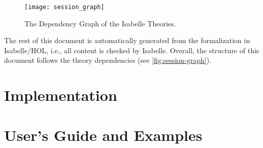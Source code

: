 \documentclass[11pt,DIV=12,a4paper,abstract=true,twoside=semi,openright]
{scrreprt}
\begin{document}
\begin{figure}
  \centering
  \texttt{[image: session\_graph]}
  \caption{The Dependency Graph of the Isabelle Theories.\label{fig:session-graph}}
\end{figure}
The rest of this document is automatically generated from the
formalization in Isabelle/HOL, i.e., all content is checked by
Isabelle.  Overall, the structure of this document follows the
theory dependencies (see \autoref{fig:session-graph}).

\chapter{Implementation}\label{ch:implementation}




\chapter{User's Guide and Examples}




%

\printbibliography
\end{document}
